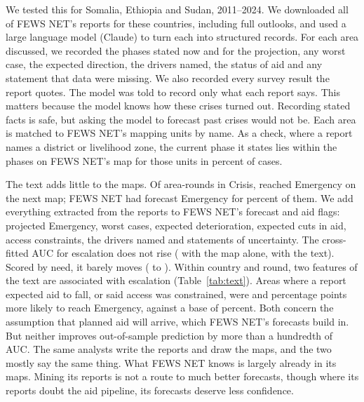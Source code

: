 \documentclass[11pt]{article}
\begin{document}
\begin{appendices}
We tested this for Somalia, Ethiopia and Sudan, 2011--2024. We downloaded all \txtReports{} of FEWS NET's reports for these countries, including \txtOutlooks{} full outlooks, and used a large language model (Claude) to turn each into structured records. For each area discussed, we recorded the phases stated now and for the projection, any worst case, the expected direction, the drivers named, the status of aid and any statement that data were missing. We also recorded every survey result the report quotes. The model was told to record only what each report says. This matters because the model knows how these crises turned out. Recording stated facts is safe, but asking the model to forecast past crises would not be. Each area is matched to FEWS NET's mapping units by name. As a check, where a report names a district or livelihood zone, the current phase it states lies within the phases on FEWS NET's map for those units in \txtMatch{} percent of \txtMatchN{} cases.

The text adds little to the maps. Of \txtEscN{} area-rounds in Crisis, \txtEscEvents{} reached Emergency on the next map; FEWS NET had forecast Emergency for \txtEscFcFour{} percent of them. We add everything extracted from the reports to FEWS NET's forecast and aid flags: projected Emergency, worst cases, expected deterioration, expected cuts in aid, access constraints, the drivers named and statements of uncertainty. The cross-fitted AUC for escalation does not rise (\txtAucMap{} with the map alone, \txtAucMapText{} with the text). Scored by need, it barely moves (\txtAucNeed{} to \txtAucNeedText{}). Within country and round, two features of the text are associated with escalation (Table~\ref{tab:text}). Areas where a report expected aid to fall, or said access was constrained, were \txtAidDown{} and \txtAccess{} percentage points more likely to reach Emergency, against a base of \nsEscBase{} percent. Both concern the assumption that planned aid will arrive, which FEWS NET's forecasts build in. But neither improves out-of-sample prediction by more than a hundredth of AUC. The same analysts write the reports and draw the maps, and the two mostly say the same thing. What FEWS NET knows is largely already in its maps. Mining its reports is not a route to much better forecasts, though where its reports doubt the aid pipeline, its forecasts deserve less confidence.



\end{appendices}
\end{document}
